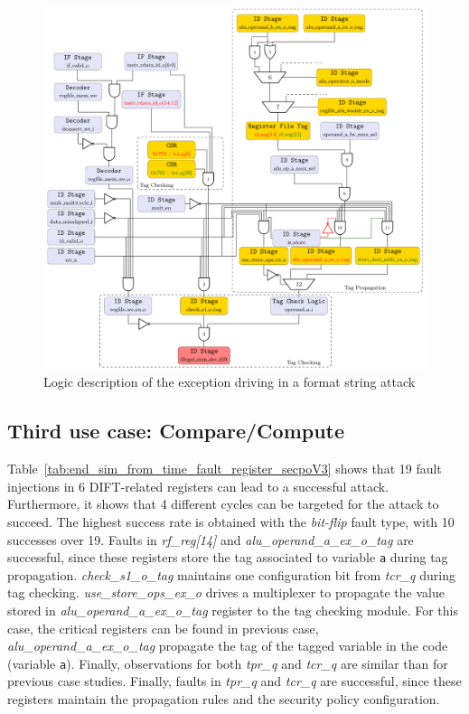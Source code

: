  \begin{figure}[ht]
    \centering
    \includegraphics[width=\linewidth]{c3_vulnerabilities_assessment/img/wuftpd/arborescence_v3_wuftpd.pdf}
    \caption{Logic description of the exception driving in a format string attack}
    \label{fig:mem_overwriting_tag_propagation}
 \end{figure}


\subsection{Third use case: Compare/Compute}
Table~\ref{tab:end_sim_from_time_fault_register_secpoV3} shows that 19 fault injections in 6 DIFT-related registers can lead to a successful attack. Furthermore, it shows that 4 different cycles can be targeted for the attack to succeed. The highest success rate is obtained with the \textit{bit-flip} fault type, with 10 successes over 19. 
Faults in \textit{rf\_reg[14]} and \textit{alu\_operand\_a\_ex\_o\_tag} are successful, since these registers store the tag associated to variable \verb|a| during tag propagation. \textit{check\_s1\_o\_tag} maintains one configuration bit from \textit{tcr\_q} during tag checking.
\textit{use\_store\_ops\_ex\_o} drives a multiplexer to propagate the value stored in \textit{alu\_operand\_a\_ex\_o\_tag} register to the tag checking module. 
For this case, the critical registers can be found in previous case, \textit{alu\_operand\_a\_ex\_o\_tag} propagate the tag of the tagged variable in the code (variable \verb|a|). 
Finally, observations for both \textit{tpr\_q} and \textit{tcr\_q} are similar than for previous case studies. 
Finally, faults in \textit{tpr\_q} and \textit{tcr\_q} are successful, since these registers maintain the propagation rules and the security policy configuration. 

